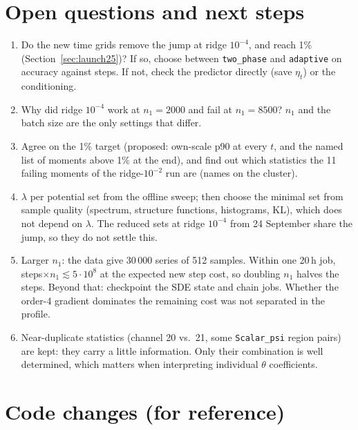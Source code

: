 \documentclass[11pt,a4paper]{article}
\newcommand{\code}[1]{\texttt{#1}}
\begin{document}
\section{Open questions and next steps}
\begin{enumerate}
  \item Do the new time grids remove the jump at ridge $10^{-4}$, and reach 1\%
        (Section~\ref{sec:launch25})? If so, choose between \code{two\_phase} and \code{adaptive} on
        accuracy against steps. If not, check the predictor directly (save $\eta_t$) or the conditioning.
  \item Why did ridge $10^{-4}$ work at $n_1=2000$ and fail at $n_1=8500$? $n_1$ and the batch size are
        the only settings that differ.
  \item Agree on the 1\% target (proposed: own-scale p90 at every $t$, and the named list of moments
        above 1\% at the end), and find out which statistics the 11 failing moments of the ridge-$10^{-2}$
        run are (names on the cluster).
  \item $\lambda$ per potential set from the offline sweep; then choose the minimal set from
        sample quality (spectrum, structure functions, histograms, KL), which does not depend on
        $\lambda$. The reduced sets at ridge $10^{-4}$ from 24 September share the jump, so they do
        not settle this.
  \item Larger $n_1$: the data give 30\,000 series of 512 samples. Within one 20\,h job,
        steps$\times n_1\lesssim5\cdot10^8$ at the expected new step cost, so doubling $n_1$ halves
        the steps. Beyond that: checkpoint the SDE state and chain jobs. Whether the order-4 gradient
        dominates the remaining cost was not separated in the profile.
  \item Near-duplicate statistics (channel 20 vs.\ 21, some \code{Scalar\_psi} region pairs) are
        kept: they carry a little information. Only their combination is well determined, which
        matters when interpreting individual $\theta$ coefficients.
\end{enumerate}

\section*{Code changes (for reference)}
\end{document}
